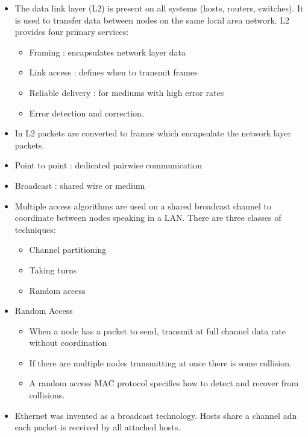 \documentclass[]{article}
\providecommand{\tightlist}{%
  \setlength{\itemsep}{0pt}\setlength{\parskip}{0pt}}
\begin{document}
\begin{itemize}
\tightlist
\item
  The data link layer (L2) is present on all systems (hosts, routers,
  switches). It is used to transfer data between nodes on the same local
  area network. L2 provides four primary services:

  \begin{itemize}
  \tightlist
  \item
    Framing : encapsulates network layer data
  \item
    Link access : defines when to transmit frames
  \item
    Reliable delivery : for mediums with high error rates
  \item
    Error detection and correction.
  \end{itemize}
\item
  In L2 packets are converted to frames which encapsulate the network
  layer packets.
\item
  Point to point : dedicated pairwise communication
\item
  Broadcast : shared wire or medium
\item
  Multiple access algorithms are used on a shared broadcast channel to
  coordinate between nodes speaking in a LAN. There are three classes of
  techniques:

  \begin{itemize}
  \tightlist
  \item
    Channel partitioning
  \item
    Taking turns
  \item
    Random access
  \end{itemize}
\item
  Random Access

  \begin{itemize}
  \tightlist
  \item
    When a node has a packet to send, transmit at full channel data rate
    without coordination
  \item
    If there are multiple nodes transmitting at once there is some
    collision.
  \item
    A random access MAC protocol specifies how to detect and recover
    from collisions.
  \end{itemize}
\item
  Ethernet was invented as a broadcast technology. Hosts share a channel
  adn each packet is received by all attached hosts.


\end{itemize}
\end{document}

